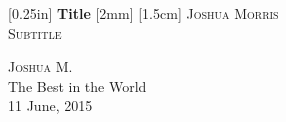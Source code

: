 \documentclass{article}
\begin{document}
\begin{titlepage}
     \begin{center}
     [0.25in]
     \huge{\bfseries Title}
     [2mm]
     [1.5cm]
     \textsc{\LARGE Joshua Morris}\\
     [0.75cm]
     \textsc{\Large Subtitle}
     \end{center}
     \begin{flushright}
     \textsc{\large Joshua M.\\}
     The Best in the World\\
     11 June, 2015

     \end{flushright}
\end{titlepage}
\end{document}
